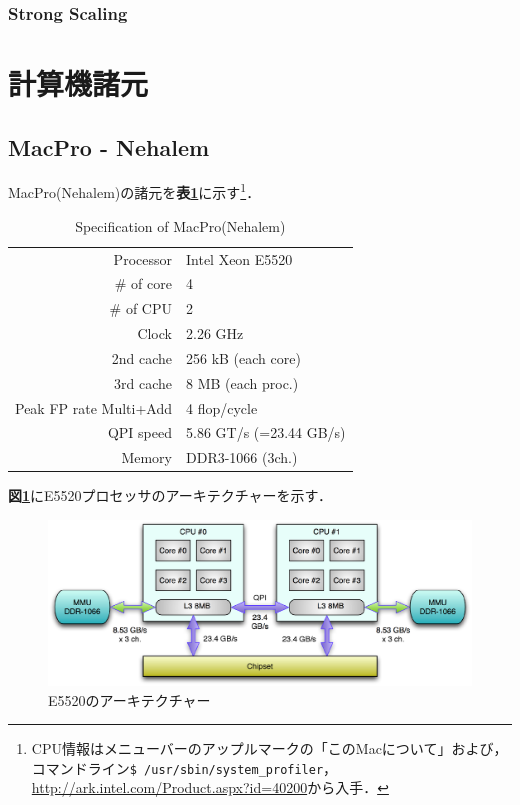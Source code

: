 %
\subsubsection{Strong Scaling}



\pagebreak
\section{計算機諸元}
%
\subsection{MacPro - Nehalem}

MacPro(Nehalem)の諸元を\textbf{表\ref{tbl:macpro-nehalem}}に示す\footnote{CPU情報はメニューバーのアップルマークの「このMacについて」および，コマンドライン\verb|$ /usr/sbin/system_profiler|，\url{http://ark.intel.com/Product.aspx?id=40200}から入手．}．

\begin{table}[htdp]
\caption{Specification of MacPro(Nehalem)}
\small
\begin{center}
\begin{tabular}{rl}\toprule
Processor & Intel Xeon E5520\\
\# of core & 4\\
\# of CPU & 2\\
Clock & 2.26 GHz\\
2nd cache & 256 kB (each core)\\
3rd cache & 8 MB (each proc.)\\
Peak FP rate Multi+Add & 4 flop/cycle\\
QPI speed & 5.86 GT/s (=23.44 GB/s)\\
Memory & DDR3-1066 (3ch.)\\ \bottomrule
\end{tabular}
\end{center}
\label{tbl:macpro-nehalem}
\end{table}

\textbf{図\ref{fig:nehalem}}にE5520プロセッサのアーキテクチャーを示す．

\begin{figure}[htdp]
\begin{center}
\includegraphics[width=14cm,clip]{E5520_arch.eps}
\end{center}
\caption{E5520のアーキテクチャー}
\label{fig:nehalem}
\end{figure}

